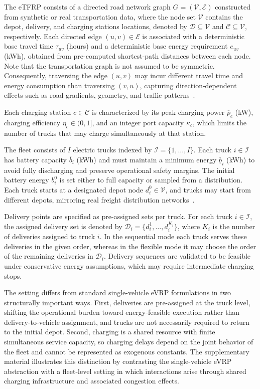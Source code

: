 \documentclass[journal]{IEEEtran}
\begin{document}
The eTFRP consists of a directed road network graph $G=(\mathcal{V},\mathcal{E})$ constructed from synthetic or real transportation data, where the node set $\mathcal{V}$ contains the depot, delivery, and charging stations locations, denoted by $\mathcal{D}\subseteq\mathcal{V}$ and $\mathcal{C}\subseteq\mathcal{V}$, respectively.
Each directed edge $(u,v)\in\mathcal{E}$ is associated with a deterministic base travel time $\tau_{uv}$ (hours) and a deterministic base energy requirement $e_{uv}$ (kWh), obtained from pre-computed shortest-path distances between each node.
Note that the transportation graph is not assumed to be symmetric. Consequently, traversing the edge $(u,v)$ may incur different travel time and energy consumption than traversing $(v,u)$, capturing direction-dependent effects such as road gradients, geometry, and traffic patterns~\cite{ziyan2025}.

Each charging station $c\in\mathcal{C}$ is characterized by its peak charging power $\overline{p}_c$ (kW), charging efficiency $\eta_c\in(0,1]$, and an integer port capacity $\kappa_c$, which limits the number of trucks that may charge simultaneously at that station.

The fleet consists of $I$ electric trucks indexed by $\mathcal{I}=\{1,\ldots,I\}$. Each truck $i \in \mathcal{I}$ has battery capacity $\overline{b}_i$ (kWh) and must maintain a minimum energy $\underline{b}_i$ (kWh) to avoid fully discharging and preserve operational safety margins. The initial battery energy $b_i^0$ is set either to full capacity or sampled from a distribution. Each truck starts at a designated depot node $d_{i}^0\in\mathcal{V}$, and trucks may start from different depots, mirroring real freight distribution networks~\cite{MOGALE2025111315}.

Delivery points are specified as pre-assigned sets per truck. 
For each truck $i\in\mathcal{I}$, the assigned delivery set is denoted by $\mathcal{D}_i=\{d_{i}^1,\ldots,d_{i}^{K_i}\}$, where $K_i$ is the number of deliveries assigned to truck $i$.  In the sequential mode each truck serves these deliveries in the given order, whereas in the flexible mode it may choose the order of the remaining deliveries in $\mathcal{D}_i$. Delivery sequences are validated to be feasible under conservative energy assumptions, which may require intermediate charging stops. 

The setting differs from standard single-vehicle eVRP formulations in two structurally important ways. First, deliveries are pre-assigned at the truck level, shifting the operational burden toward energy-feasible execution rather than delivery-to-vehicle assignment, and trucks are not necessarily required to return to the initial depot. Second, charging is a shared resource with finite simultaneous service capacity, so charging delays depend on the joint behavior of the fleet and cannot be represented as exogenous constants.
The supplementary material illustrates this distinction by contrasting the single-vehicle eVRP abstraction with a fleet-level setting in which interactions arise through shared charging infrastructure and associated congestion effects.
\end{document}

